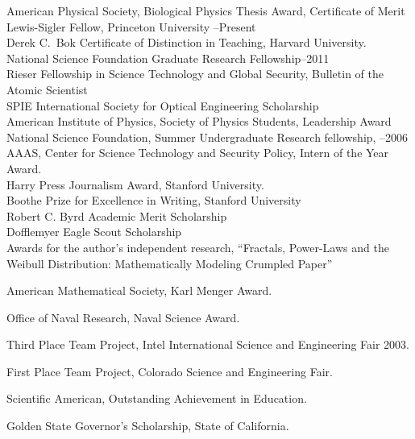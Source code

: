 \documentclass[11pt]{article}
\newenvironment{listinline}{
	  \begin{list}{}{
	      \setlength{\itemsep}{0in}
	      \setlength{\parsep}{0in} \setlength{\parskip}{0in}
	      \setlength{\topsep}{0in} \setlength{\partopsep}{0in} 
	      \setlength{\leftmargin}{0.2in}\setlength{\rightmargin}{0.2in}}}{\end{list}}
\begin{document}
American Physical Society, Biological Physics Thesis Award, Certificate of Merit \\
Lewis-Sigler Fellow, Princeton University --Present\\
Derek C.~Bok Certificate of Distinction in Teaching, Harvard University.\\
National Science Foundation Graduate Research Fellowship--2011\\
Rieser Fellowship in Science Technology and Global Security, Bulletin of the Atomic Scientist\\
SPIE International Society for Optical Engineering Scholarship\\
American Institute of Physics, Society of Physics Students, Leadership Award\\
National Science Foundation, Summer Undergraduate Research fellowship, --2006\\
AAAS, Center for Science Technology and Security Policy, Intern of the Year Award.\\
Harry Press Journalism Award, Stanford University.\\
Boothe Prize for Excellence in Writing, Stanford University\\
Robert C. Byrd Academic Merit Scholarship\\
Dofflemyer Eagle Scout Scholarship\\
Awards for the author's independent research, ``Fractals, Power-Laws and the Weibull Distribution: Mathematically Modeling Crumpled Paper''\\
\vspace{-\baselineskip}
\begin{listinline}
\item American Mathematical Society, Karl Menger Award.
\item Office of Naval Research, Naval Science Award.
\item Third Place Team Project, Intel International Science and Engineering Fair 2003.
\item First Place Team Project, Colorado Science and Engineering Fair.
\item Scientific American, Outstanding Achievement in Education.
\end{listinline}
Golden State Governor's Scholarship, State of California.\\
\end{document}

